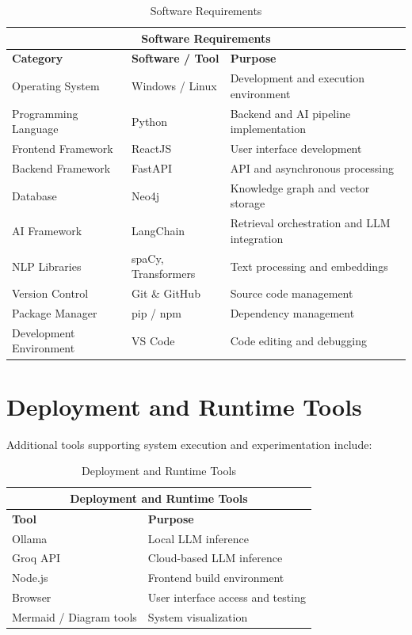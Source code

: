 \begin{table}[h]
  \centering
  \caption{Software Requirements}
  \begin{tabular}{|p{4cm}|p{4.5cm}|p{5.5cm}|}
    \hline
    \multicolumn{3}{|c|}{\textbf{Software Requirements}} \\
    \hline
    \textbf{Category} & \textbf{Software / Tool} & \textbf{Purpose} \\
    \hline
    Operating System & Windows / Linux & Development and execution environment \\
    Programming Language & Python & Backend and AI pipeline implementation \\
    Frontend Framework & ReactJS & User interface development \\
    Backend Framework & FastAPI & API and asynchronous processing \\
    Database & Neo4j & Knowledge graph and vector storage \\
    AI Framework & LangChain & Retrieval orchestration and LLM integration \\
    NLP Libraries & spaCy, Transformers & Text processing and embeddings \\
    Version Control & Git \& GitHub & Source code management \\
    Package Manager & pip / npm & Dependency management \\
    Development Environment & VS Code & Code editing and debugging \\
    \hline
  \end{tabular}
  \label{tab:software_requirements}
\end{table}

\section{Deployment and Runtime Tools}

Additional tools supporting system execution and experimentation include:

\begin{table}[h]
  \centering
  \caption{Deployment and Runtime Tools}
  \begin{tabular}{|p{4.5cm}|p{7.5cm}|}
    \hline
    \multicolumn{2}{|c|}{\textbf{Deployment and Runtime Tools}} \\
    \hline
    \textbf{Tool} & \textbf{Purpose} \\
    \hline
    Ollama & Local LLM inference \\
    Groq API & Cloud-based LLM inference \\
    Node.js & Frontend build environment \\
    Browser & User interface access and testing \\
    Mermaid / Diagram tools & System visualization \\
    \hline
  \end{tabular}
  \label{tab:deployment_tools}
\end{table}
